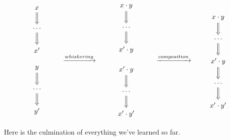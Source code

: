 \documentclass[../generics]{subfiles}
\begin{document}
\begin{figure}\label{monoid operation well defined}
\[
\begin{array}{c}
\begin{tikzcd}
x\arrow[d, Rightarrow]\\
\cdots\arrow[d, Rightarrow]\\
x^\prime
\end{tikzcd}\\
\\
\begin{tikzcd}
y\arrow[d, Rightarrow]\\
\cdots\arrow[d, Rightarrow]\\
y^\prime
\end{tikzcd}
\end{array} \qquad \xrightarrow{whiskering} \qquad
\begin{array}{c}
\begin{tikzcd}
x\cdot y\arrow[d, Rightarrow]\\
\cdots \arrow[d, Rightarrow]\\
x^\prime\cdot y
\end{tikzcd}\\
\\
\begin{tikzcd}
x^\prime\cdot y\arrow[d, Rightarrow]\\
\cdots\arrow[d, Rightarrow]\\
x^\prime\cdot y^\prime
\end{tikzcd}
\end{array} \qquad \xrightarrow{composition} \qquad
\begin{tikzcd}
x\cdot y\arrow[d, Rightarrow]\\
\cdots\arrow[d, Rightarrow]\\
x^\prime\cdot y\arrow[d, Rightarrow]\\
\cdots\arrow[d, Rightarrow]\\
x^\prime\cdot y^\prime
\end{tikzcd}
\]
\end{figure}
Here is the culmination of everything we've learned so far.
\end{document}
